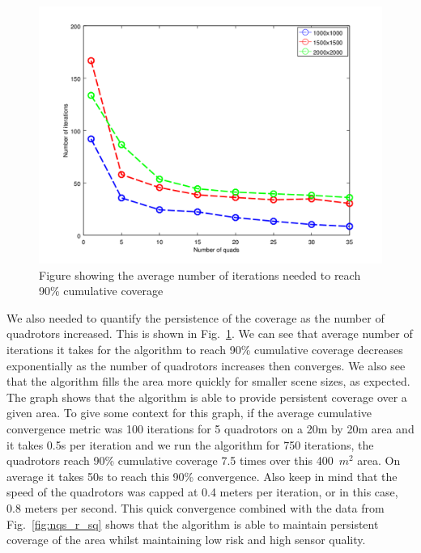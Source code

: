 \documentclass{article}
\begin{document}
\begin{figure}[h!]

    \includegraphics[width=1\columnwidth]{tasefigs/perf_quads.png}

    \caption{Figure showing the average number of iterations needed to reach
        90\% cumulative coverage}

    \label{fig:nqs_cum}

\end{figure}

We also needed to quantify the persistence of the coverage as the number of
quadrotors increased. This is shown in Fig.~\ref{fig:nqs_cum}. We can see that
average number of iterations it takes for the algorithm to reach 90\%
cumulative coverage decreases exponentially as the number of quadrotors
increases then converges. We also see that the algorithm fills the area more
quickly for smaller scene sizes, as expected. The graph shows that the
algorithm is able to provide persistent coverage over a given area. To give
some context for this graph, if the average cumulative convergence metric was
100 iterations for 5 quadrotors on a 20m by 20m area and it takes 0.5s per
iteration and we run the algorithm for 750 iterations, the quadrotors reach
90\% cumulative coverage 7.5 times over this 400~$m^2$ area. On average it
takes 50s to reach this 90\% convergence. Also keep in mind that the speed of
the quadrotors was capped at 0.4 meters per iteration, or in this case, 0.8
meters per second. This quick convergence combined with the data from
Fig.~\ref{fig:nqs_r_sq} shows that the algorithm is able to maintain persistent
coverage of the area whilst maintaining low risk and high sensor quality.
\end{document}
